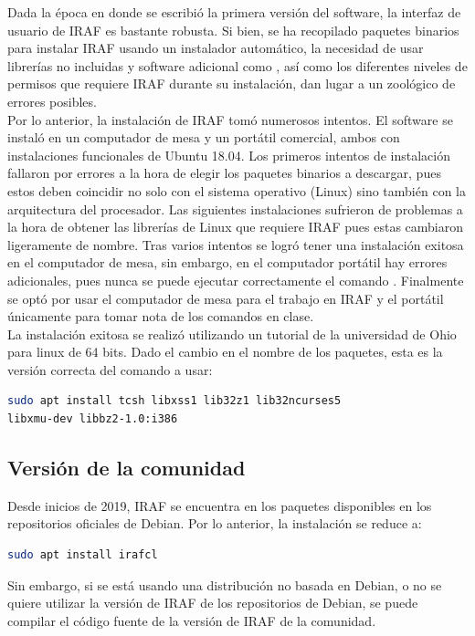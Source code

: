 \documentclass[12pt]{article}
\begin{document}
Dada la época en donde se escribió la primera versión del software, la interfaz de usuario de IRAF es bastante robusta. Si bien, se ha recopilado paquetes binarios para instalar IRAF usando un instalador automático, la necesidad de usar librerías no incluidas y software adicional como , así como los diferentes niveles de permisos que requiere IRAF durante su instalación, dan lugar a un zoológico de errores posibles.\\
Por lo anterior, la instalación de IRAF tomó numerosos intentos. El software se instaló en un computador de mesa y un portátil comercial, ambos con instalaciones funcionales de Ubuntu 18.04. Los primeros intentos de instalación fallaron por errores a la hora de elegir los paquetes binarios a descargar, pues estos deben coincidir no solo con el sistema operativo (Linux) sino también con la arquitectura del procesador. Las siguientes instalaciones sufrieron de problemas a la hora de obtener las librerías de Linux que requiere IRAF pues estas cambiaron ligeramente de nombre. Tras varios intentos se logró tener una instalación exitosa en el computador de mesa, sin embargo, en el computador portátil hay errores adicionales, pues nunca se puede ejecutar correctamente el comando . Finalmente se optó por usar el computador de mesa para el trabajo en IRAF y el portátil únicamente para tomar nota de los comandos en clase.\\
La instalación exitosa se realizó utilizando un tutorial de la universidad de Ohio para linux de 64 bits\cite{OhioTutorial}. Dado el cambio en el nombre de los paquetes, esta es la versión correcta del comando a usar:

\begin{lstlisting}[language=bash]
sudo apt install tcsh libxss1 lib32z1 lib32ncurses5 
libxmu-dev libbz2-1.0:i386 
\end{lstlisting}

\subsection{Versión de la comunidad}
Desde inicios de 2019, IRAF se encuentra en los paquetes disponibles en los repositorios oficiales de Debian.
Por lo anterior, la instalación se reduce a:
\begin{lstlisting}[language=bash]
sudo apt install irafcl
\end{lstlisting}

Sin embargo, si se está usando una distribución no basada en Debian, o no se quiere utilizar la versión de IRAF de los repositorios de Debian, se puede compilar el código fuente de la versión de IRAF de la comunidad.
\end{document}
